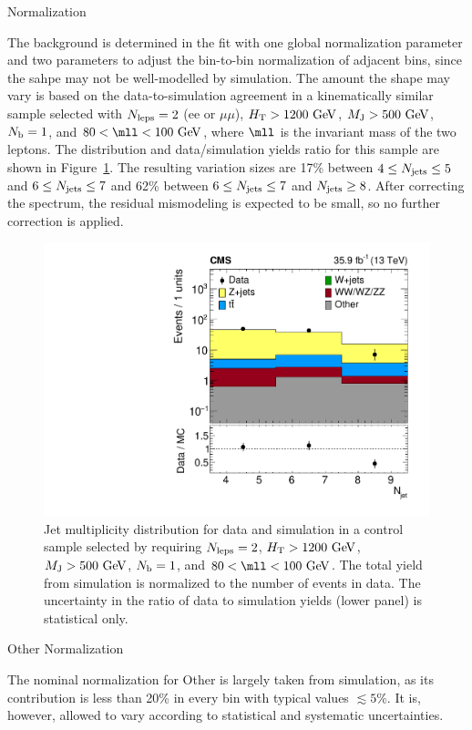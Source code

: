\begin{section}{\Wjets Normalization}

The \Wjets background is determined in the fit with one global normalization parameter and two parameters to adjust the bin-to-bin normalization of adjacent \Njets bins, since the \Njets sahpe may not be well-modelled by simulation.
The amount the \Njets shape may vary is based on the data-to-simulation agreement in a kinematically similar \Zjets sample selected with $N_{\mathrm{leps}} = 2$ ($\mathrm{ee}$ or $\mu\mu$), $H_\mathrm{T} > 1200~\mathrm{Ge\kern -0.1em V}$, $M_\mathrm{J} > 500~\mathrm{Ge\kern -0.1em V}$, $N_\mathrm{b} = 1$, and $80 < \mll < 100~\GeV$, where $\mll$ is the invariant mass of the two leptons.
The \Njets distribution and data/simulation yields ratio for this sample are shown in Figure~\ref{fig:njets_dy}.
The resulting variation sizes are 17\% between $4 \leq N_{\mathrm{jets}} \leq 5$ and $6 \leq N_{\mathrm{jets}} \leq 7$ and 62\% between $6 \le N_{\mathrm{jets}} \le 7$ and $N_{\mathrm{jets}} \ge8$.
After correcting the \Njets spectrum, the residual \MJ mismodeling is expected to be small, so no further correction is applied.

\begin{figure}[tbp!]
\centering
\includegraphics[angle=0,width=0.60\columnwidth]{fig/njets_dy.pdf}
\caption{Jet multiplicity distribution for data and simulation in a \Zjets control sample selected by requiring $N_{\mathrm{leps}} = 2$, $H_\mathrm{T} > 1200~\mathrm{Ge\kern -0.1em V}$, $M_\mathrm{J} > 500~\mathrm{Ge\kern -0.1em V}$, $N_\mathrm{b} = 1$, and $80 < \mll < 100~\GeV$.
The total yield from simulation is normalized to the number of events in data.
The uncertainty in the ratio of data to simulation yields (lower panel) is statistical only.}
\label{fig:njets_dy}
\end{figure}

\end{section}

\begin{section}{Other Normalization}

The nominal normalization for Other is largely taken from simulation, as its contribution is less than 20\% in every bin with typical values $\lesssim 5\%$.
It is, however, allowed to vary according to statistical and systematic uncertainties.

\end{section}

